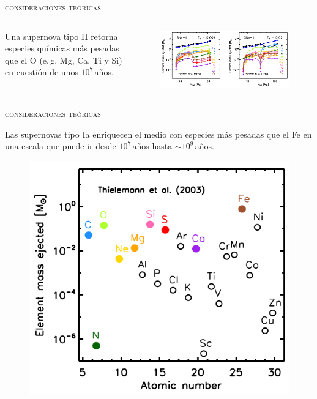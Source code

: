 \documentclass[xcolor=dvipsnames,4pt,hyperref={colorlinks,citecolor=black,linkcolor=black,urlcolor=black}]{beamer}
\begin{document}
\begin{frame}{\textsc{consideraciones teóricas}}

\begin{columns}
Una supernova tipo II retorna especies químicas más pesadas que el O (e.\,g. Mg, Ca, Ti y Si) en
cuestión de unos $10^7\,$años.
\begin{figure}
\includegraphics[scale=1]{img/yates2013-4}
\end{figure}
\end{columns}
\end{frame}

\begin{frame}{\textsc{consideraciones teóricas}}

Las supernovas tipo Ia enriquecen el medio con especies más pesadas que el Fe en una escala que
puede ir desde $10^7\,$años hasta $\sim10^9\,$años.
\begin{figure}
\includegraphics[scale=1]{img/yates2013-3}
\end{figure}
\end{frame}
\end{document}
